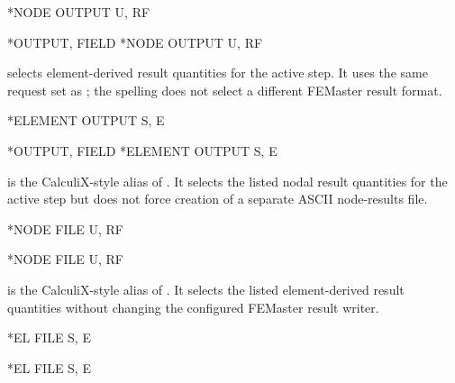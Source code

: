 \exampleheading
\begin{dialectexamples}
\begin{femasterdeck}
*NODE OUTPUT
U, RF
\end{femasterdeck}
\begin{abaqusdeck}
*OUTPUT, FIELD
*NODE OUTPUT
U, RF
\end{abaqusdeck}
\end{dialectexamples}


 selects element-derived result quantities for the active step. It uses the same request set as ; the spelling does not select a different FEMaster result format.

\exampleheading
\begin{dialectexamples}
\begin{femasterdeck}
*ELEMENT OUTPUT
S, E
\end{femasterdeck}
\begin{abaqusdeck}
*OUTPUT, FIELD
*ELEMENT OUTPUT
S, E
\end{abaqusdeck}
\end{dialectexamples}


 is the CalculiX-style alias of . It selects the listed nodal result quantities for the active step but does not force creation of a separate ASCII node-results file.

\exampleheading
\begin{dialectexamples}
\begin{femasterdeck}
*NODE FILE
U, RF
\end{femasterdeck}
\begin{abaqusdeck}
*NODE FILE
U, RF
\end{abaqusdeck}
\end{dialectexamples}


 is the CalculiX-style alias of . It selects the listed element-derived result quantities without changing the configured FEMaster result writer.

\exampleheading
\begin{dialectexamples}
\begin{femasterdeck}
*EL FILE
S, E
\end{femasterdeck}
\begin{abaqusdeck}
*EL FILE
S, E
\end{abaqusdeck}
\end{dialectexamples}

